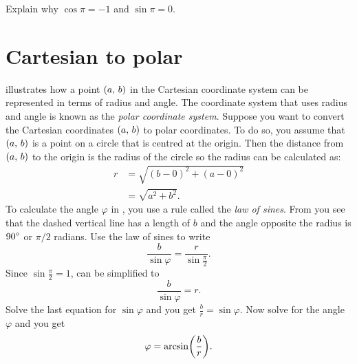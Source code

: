 \documentclass[a4paper,oneside,12pt]{article}
\begin{document}
\begin{exercise}
Explain why $\cos\pi = -1$ and $\sin\pi = 0$.
\end{exercise}




\section{Cartesian to polar}

 illustrates
how a point $\left\lparen{a},\, {b}\right\rparen$ in the Cartesian coordinate system can be
represented in terms of radius and angle.  The coordinate system that
uses radius and angle is known as the \emph{polar coordinate system}.
Suppose you want to convert the Cartesian coordinates $\left\lparen{a},\, {b}\right\rparen$
to polar coordinates.  To do so, you assume that $\left\lparen{a},\, {b}\right\rparen$ is a
point on a circle that is centred at the origin.  Then the distance
from $\left\lparen{a},\, {b}\right\rparen$ to the origin is the radius of the circle so the
radius can be calculated as:
\begin{align*}
r
&=
\sqrt{
  (b - 0)^2 + (a - 0)^2
} \\[4pt]
&=
\sqrt{
  a^2 + b^2
}.
\end{align*}
To calculate the angle $\varphi$ in
, you use a
rule called the \emph{law of sines}.  From
 you see that
the dashed vertical line has a length of $b$ and the angle opposite
the radius is ${90}^{\circ}$ or $\pi / 2$ radians.  Use the law of
sines to write
\begin{equation}
\label{eqn:law_of_sines}
\frac{b}{\sin \varphi}
=
\frac{r}{\sin \frac{\pi}{2}}.
\end{equation}
Since $\sin \frac{\pi}{2} = 1$,  can be
simplified to
\[
\frac{b}{\sin \varphi}
=
r.
\]
Solve the last equation for $\sin \varphi$ and you get
$\frac{b}{r} = \sin \varphi$.  Now solve for the angle $\varphi$ and
you get
\[
\varphi
=
\arcsin\parenthesis*{\frac{b}{r}}.
\]
\end{document}
